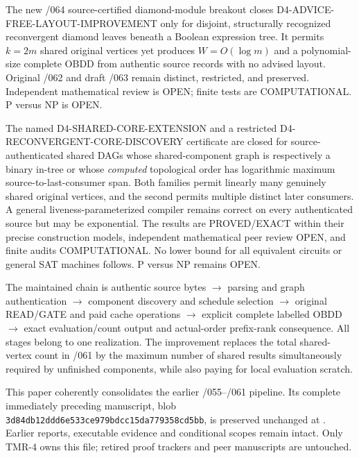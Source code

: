 \documentclass[11pt]{article}
\begin{document}
The new /064 source-certified diamond-module breakout closes D4-ADVICE-FREE-LAYOUT-IMPROVEMENT only for disjoint, structurally recognized reconvergent diamond leaves beneath a Boolean expression tree. It permits $k=2m$ shared original vertices yet produces $W=O(\log m)$ and a polynomial-size complete OBDD from authentic source records with no advised layout. Original /062 and draft /063 remain distinct, restricted, and preserved. Independent mathematical review is OPEN; finite tests are COMPUTATIONAL. P versus NP is OPEN.

The named D4-SHARED-CORE-EXTENSION and a restricted D4-RECONVERGENT-CORE-DISCOVERY certificate are closed for source-authenticated shared DAGs whose shared-component graph is respectively a binary in-tree or whose \emph{computed} topological order has logarithmic maximum source-to-last-consumer span. Both families permit linearly many genuinely shared original vertices, and the second permits multiple distinct later consumers. A general liveness-parameterized compiler remains correct on every authenticated source but may be exponential. The results are PROVED/EXACT within their precise construction models, independent mathematical peer review OPEN, and finite audits COMPUTATIONAL. No lower bound for all equivalent circuits or general SAT machines follows. P versus NP remains OPEN.

The maintained chain is authentic source bytes $\to$ parsing and graph authentication $\to$ component discovery and schedule selection $\to$ original READ/GATE and paid cache operations $\to$ explicit complete labelled OBDD $\to$ exact evaluation/count output and actual-order prefix-rank consequence. All stages belong to one realization. The improvement replaces the total shared-vertex count in /061 by the maximum number of shared results simultaneously required by unfinished components, while also paying for local evaluation scratch.

This paper coherently consolidates the earlier /055--/061 pipeline. Its complete immediately preceding manuscript, blob \texttt{3d84db12ddd6e533ce979bdcc15da779358cd5bb}, is preserved unchanged at . Earlier reports, executable evidence and conditional scopes remain intact. Only TMR-4 owns this file; retired proof trackers and peer manuscripts are untouched.
\end{document}
